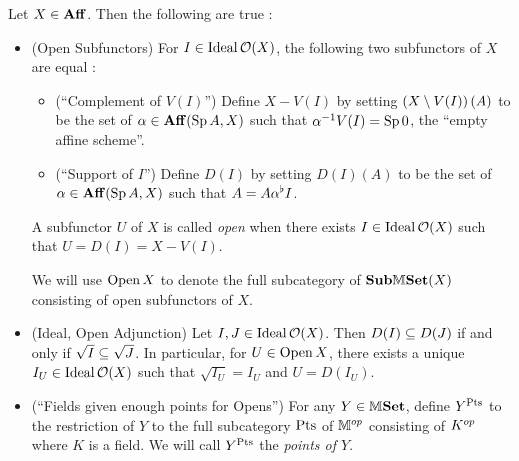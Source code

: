 \documentclass[../main.tex]{subfiles}
\begin{document}
\begin{prop}
  
  Let $X \in \mathbf{Aff}$. Then the following are true : 
  \begin{itemize}
    \item (Open Subfunctors) For $I \in \operatorname{Ideal}\mathcal{O}(X)$,
    the following two subfunctors of $X$ are equal : 
    \begin{itemize}
      \item (``Complement of $V(I)$'')
      Define $X\minus V(I)$ by setting 
      $\left(X\setminus V(I)\right)(A)$ to be 
      the set of $\alpha \in \mathbf{Aff}(\operatorname{Sp} A, X)$ such that
      $\alpha^{-1} V(I) = \operatorname{Sp} 0$, the ``empty affine scheme''.
      \item (``Support of $I$'')
      Define $D(I)$ by setting 
      $D(I)(A)$ to be the set of $\alpha \in \mathbf{Aff}(\operatorname{Sp} A, X)$ such that 
      $A = A\alpha^\flat I$.
    \end{itemize}
    A subfunctor $U$ of $X$ is called \emph{open} when 
    there exists $I \in\operatorname{Ideal}\mathcal{O}(X)$ such that $U = D(I) = X\minus V(I)$.

    We will use $\operatorname{Open} X$ to denote the full subcategory of $\mathbf{Sub}\mathbb{M}\mathbf{Set}(X)$
    consisting of open subfunctors of $X$.
    \item (Ideal, Open Adjunction)
    Let $I, J \in \operatorname{Ideal}\mathcal{O}(X)$.
    Then $D(I) \subseteq D(J)$ if and only if $\sqrt{I} \subseteq \sqrt{J}$.
    In particular, for $U \in \operatorname{Open} X$,
    there exists a unique $I_U \in \operatorname{Ideal}\mathcal{O}(X)$ such that 
    $\sqrt{I_U} = I_U$ and $U = D(I_U)$.

    \item (``Fields given enough points for Opens'')
    For any $Y \in \mathbb{M}\mathbf{Set}$, 
    define $Y^{\mathrm{Pts}}$ to the restriction of $Y$ to 
    the full subcategory $\mathrm{Pts}$ of $\mathbb{M}^{op}$ consisting of 
    $K^{op}$ where $K$ is a field. 
    We will call $Y^{\mathrm{Pts}}$ the \emph{points of $Y$}.


\end{itemize}
\end{prop}
\end{document}
